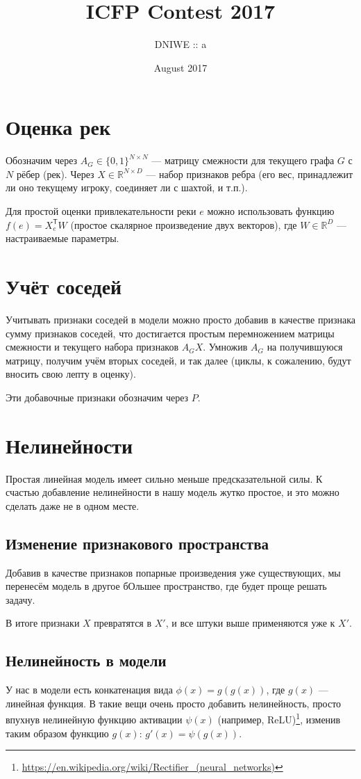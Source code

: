 \documentclass[14pt,a4paper]{article}
\title{ICFP Contest 2017}
\author{DNIWE :: a}
\date{August 2017}
\newcommand{\Tr}{\mathsf{\scriptstyle T}}
\def\RR{\mathbb{R}}
\begin{document}
\maketitle

\section{Оценка рек}

Обозначим через $ A_G \in \{0, 1\}^{N \times N} $ --- матрицу смежности для текущего графа $ G $ с $ N $ рёбер (рек).
Через $ X \in \RR^{N \times D} $ --- набор признаков ребра (его вес, принадлежит ли оно текущему игроку, соединяет ли с шахтой, и т.п.).

Для простой оценки привлекательности реки $ e $ можно использовать функцию $ f(e) = X_e^\Tr W $ (простое скалярное произведение двух векторов), где $ W \in \RR^{D} $  --- настраиваемые параметры.

\section{Учёт соседей}

Учитывать признаки соседей в модели можно просто добавив в качестве признака сумму признаков соседей, что достигается простым перемножением матрицы смежности и текущего набора признаков $ A_G X $.
Умножив $ A_G $ на получившуюся матрицу, получим учём вторых соседей, и так далее (циклы, к сожалению, будут вносить свою лепту в оценку).

Эти добавочные признаки обозначим через $ P $.

\section{Нелинейности}

Простая линейная модель имеет сильно меньше предсказательной силы.
К счастью добавление нелинейности в нашу модель жутко простое, и это можно сделать даже не в одном месте.

\subsection{Изменение признакового пространства}

Добавив в качестве признаков попарные произведения уже существующих, мы перенесём модель в другое бОльшее пространство, где будет проще решать задачу.

В итоге признаки $ X $ превратятся в $ X' $, и все штуки выше применяются уже к $ X' $.

\subsection{Нелинейность в модели}

У нас в модели есть конкатенация вида $ \phi(x) = g(g(x)) $, где $ g(x) $ --- линейная функция.
В такие вещи очень просто добавить нелинейность, просто впухнув нелинейную функцию активации $ \psi(x) $ (например, ReLU)\footnote{\url{https://en.wikipedia.org/wiki/Rectifier_(neural_networks)}}, изменив таким образом функцию $ g(x) $: $ g'(x) = \psi(g(x)) $.
\end{document}
